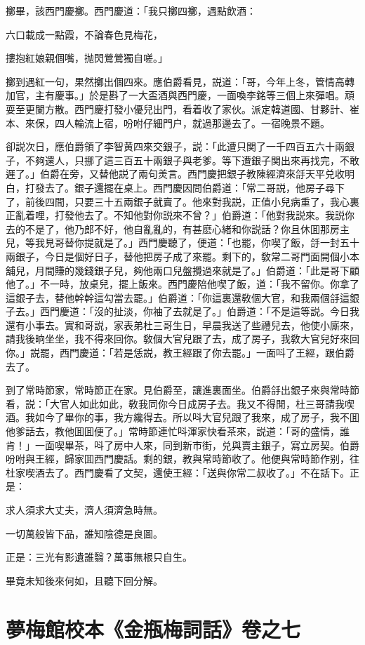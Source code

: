 擲畢，該西門慶擲。西門慶道：「我只擲四擲，遇點飲酒：

\begin{myquote}
六口載成一點霞，不論春色見梅花，

摟抱紅娘親個嘴，抛閃鶯鶯獨自嗟。」
\end{myquote}

擲到遇紅一句，果然擲出個四來。應伯爵看見，説道：「哥，今年上冬，管情高轉加官，主有慶事。」於是斟了一大盃酒與西門慶，一面喚李銘等三個上來彈唱。頑耍至更闌方散。西門慶打發小優兒出門，看着收了家伙。派定韓道國、甘夥計、崔本、來保，四人輪流上宿，吩咐仔細門户，就過那邊去了。一宿晚景不題。

卻説次日，應伯爵領了李智黄四來交銀子，説：「此遭只関了一千四百五六十兩銀子，不夠還人，只挪了這三百五十兩銀子與老爹。等下遭銀子関出來再找完，不敢遲了。」伯爵在旁，又替他説了兩句羙言。西門慶把銀子教陳經濟來㧱天平兑收明白，打發去了。銀子還擺在桌上。西門慶因問伯爵道：「常二哥説，他房子尋下了，前後四間，只要三十五兩銀子就賣了。他來對我説，正值小兒病重了，我心裏正亂着哩，打發他去了。不知他對你説來不曾？」伯爵道：「他對我説來。我説你去的不是了，他乃郎不好，他自亂亂的，有甚麽心緒和你説話？你且休囬那房主兒，等我見哥替你提就是了。」西門慶聽了，便道：「也罷，你喫了飯，㧱一封五十兩銀子，今日是個好日子，替他把房子成了來罷。剩下的，敎常二哥門面開個小本舖兒，月間賺的幾錢銀子兒，夠他兩口兒盤攪過來就是了。」伯爵道：「此是哥下顧他了。」不一時，放桌兒，擺上飯來。西門慶陪他喫了飯，道：「我不留你。你拿了這銀子去，替他幹幹這勾當去罷。」伯爵道：「你這裏還敎個大官，和我兩個㧱這銀子去。」西門慶道：「沒的扯淡，你袖了去就是了。」伯爵道：「不是這等説。今日我還有小事去。實和哥説，家表弟杜三哥生日，早晨我送了些禮兒去，他使小廝來，請我後晌坐坐，我不得來回你。敎個大官兒跟了去，成了房子，我敎大官兒好來回你。」説罷，西門慶道：「若是恁説，教王經跟了你去罷。」一面呌了王經，跟伯爵去了。

到了常時節家，常時節正在家。見伯爵至，讓進裏面坐。伯爵㧱出銀子來與常時節看，説：「大官人如此如此，敎我同你今日成房子去。我又不得閒，杜三哥請我喫酒。我如今了畢你的事，我方纔得去。所以呌大官兒跟了我來，成了房子，我不囬他爹話去，教他囬囬便了。」常時節連忙呌渾家快看茶來，説道：「哥的盛情，誰肯！」一面喫畢茶，呌了房中人來，同到新市街，兑與賣主銀子，寫立房契。伯爵吩咐與王經，歸家囬西門慶話。剩的銀，教與常時節收了。他便與常時節作别，往杜家喫酒去了。西門慶看了文契，還使王經：「送與你常二叔收了。」不在話下。正是：

\begin{myquote}
求人須求大丈夫，濟人須濟急時無。

一切萬般皆下品，誰知陰德是良圖。
\end{myquote}

正是：三光有影遺誰翳？萬事無根只自生。

畢竟未知後來何如，且聽下回分解。

\part*{夢梅館校本《金瓶梅詞話》卷之七}

